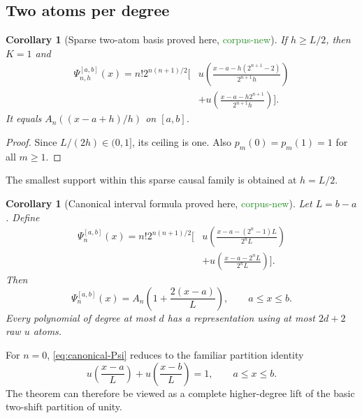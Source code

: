 \documentclass[11pt]{article}
\newtheorem{corollary}[theorem]{Corollary}
\theoremstyle{definition}
\theoremstyle{remark}
\newcommand{\1}{\mathbf{1}}
\newcommand{\CorpusNew}{\textcolor{ForestGreen}{\textsf{corpus-new}}}
\newcommand{\ProvedHere}{\textcolor{BrickRed}{\textsf{proved here}}}
\begin{document}
\subsection{Two atoms per degree}

\begin{corollary}[Sparse two-atom basis \ProvedHere, \CorpusNew]
\label{cor:two-atom}
If $h\geq L/2$, then $K=1$ and
\begin{equation}
\begin{aligned}
 \Psi_{n,h}^{[a,b]}(x)
 =n!2^{n(n+1)/2}\bigg[&
 u\!\left(\frac{x-a-h(2^{n+1}-2)}{2^{n+1}h}\right)\\
 &+u\!\left(\frac{x-a-h2^{n+1}}{2^{n+1}h}\right)
 \bigg].
 \label{eq:two-atom-general-h}
\end{aligned}
\end{equation}
It equals $A_n((x-a+h)/h)$ on $[a,b]$.
\end{corollary}

\begin{proof}
Since $L/(2h)\in(0,1]$, its ceiling is one.  Also
$p_m(0)=p_m(1)=1$ for all $m\geq1$.
\end{proof}

The smallest support within this sparse causal family is obtained at
$h=L/2$.

\begin{corollary}[Canonical interval formula \ProvedHere, \CorpusNew]
\label{cor:canonical}
Let $L=b-a$.  Define
\begin{equation}
\boxed{
\begin{aligned}
 \Psi_n^{[a,b]}(x)
 =n!2^{n(n+1)/2}\bigg[&
 u\!\left(\frac{x-a-(2^n-1)L}{2^nL}\right)\\
 &+u\!\left(\frac{x-a-2^nL}{2^nL}\right)
 \bigg].
\end{aligned}}
\label{eq:canonical-Psi}
\end{equation}
Then
\begin{equation}
 \Psi_n^{[a,b]}(x)=A_n\!\left(1+\frac{2(x-a)}L\right),
 \qquad a\leq x\leq b.
 \label{eq:canonical-Appell}
\end{equation}
Every polynomial of degree at most $d$ has a representation using at most
$2d+2$ raw $u$ atoms.
\end{corollary}

For $n=0$, \eqref{eq:canonical-Psi} reduces to the familiar partition identity
\begin{equation}
 u\!\left(\frac{x-a}{L}\right)
 +u\!\left(\frac{x-b}{L}\right)=1,
 \qquad a\leq x\leq b.
 \label{eq:partition-unity-interval}
\end{equation}
The theorem can therefore be viewed as a complete higher-degree lift of the
basic two-shift partition of unity.
\end{document}
